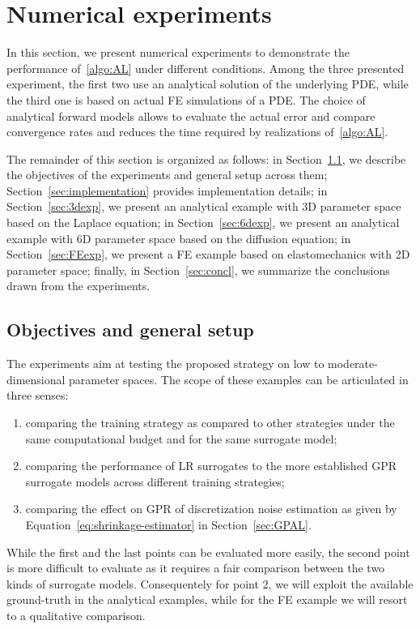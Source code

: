 \section{Numerical experiments}\label{sec:exp}

In this section, we present numerical experiments to demonstrate the performance of~\ref{algo:AL} under different conditions. 
Among the three presented experiment, the first two use an analytical solution of the underlying PDE, while the third one is based on actual FE simulations of a PDE.
The choice of analytical forward models allows to evaluate the actual error and compare convergence rates and reduces the time required by realizations of~\ref{algo:AL}. \medskip 

The remainder of this section is organized as follows: in Section~\ref{sec:setup}, we describe the objectives of the experiments and general setup across them; Section~\ref{sec:implementation} provides implementation details; in Section~\ref{sec:3dexp}, we present an analytical example with 3D parameter space based on the Laplace equation; in Section~\ref{sec:6dexp}, we present an analytical example with 6D parameter space based on the diffusion equation; in Section~\ref{sec:FEexp}, we present a FE example based on elastomechanics with 2D parameter space; finally, in Section~\ref{sec:concl}, we summarize the conclusions drawn from the experiments.

\subsection{Objectives and general setup}\label{sec:setup}

The experiments aim at testing the proposed strategy on low to moderate-dimensional parameter spaces.
The scope of these examples can be articulated in three senses:
\begin{enumerate}
    \item comparing the training strategy as compared to other strategies under the same computational budget and for the same surrogate model;
    \item comparing the performance of LR surrogates to the more established GPR surrogate models across different training strategies;
    \item comparing the effect on GPR of discretization noise estimation as given by Equation~\eqref{eq:shrinkage-estimator} in Section~\ref{sec:GPAL}.
\end{enumerate}
While the first and the last points can be evaluated more easily, the second point is more difficult to evaluate as it requires a fair comparison between the two kinds of surrogate models.
Consequentely for point 2, we will exploit the available ground-truth in the analytical examples, while for the FE example we will resort to a qualitative comparison. \medskip

